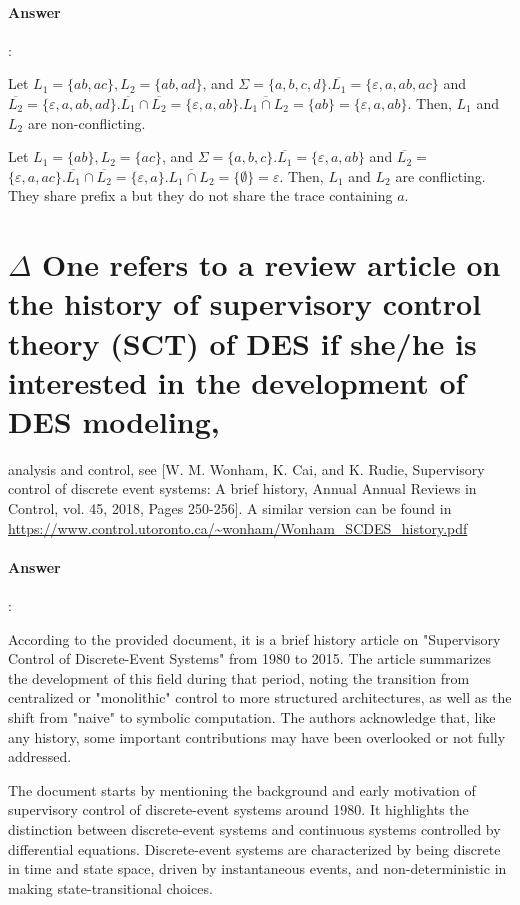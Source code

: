 \documentclass{article}
\begin{document}
\paragraph{Answer}:

Let $L_1=\{a b, a c\}, L_2=\{a b, a d\}$, and $\Sigma=\{a, b, c, d\} . \overline{L_1}=\{\varepsilon, a, a b, a c\}$ and $\overline{L_2}=\{\varepsilon, a, a b, a d\} . \overline{L_1} \cap \overline{L_2}=\{\varepsilon, a, a b\} . \overline{L_1 \cap L_2}=\{a b\}=\{\varepsilon, a, a b\}$. Then, $L_1$ and $L_2$ are non-conflicting.

Let $L_1=\{a b\}, L_2=\{a c\}$, and $\Sigma=\{a, b, c\} . \overline{L_1}=\{\varepsilon, a, a b\}$ and $\overline{L_2}=$ $\{\varepsilon, a, a c\} . \overline{L_1} \cap \overline{L_2}=\{\varepsilon, a\} . \overline{L_1 \cap L_2}=\{\emptyset\}=\varepsilon$. Then, $L_1$ and $L_2$ are conflicting. They share prefix a but they do not share the trace containing $a$.

\section{$\Delta $ One refers to a review article on the history of supervisory control theory (SCT) of DES if she/he is interested in the development of DES modeling, }

analysis and control, see [W. M. Wonham, K. Cai, and K. Rudie, Supervisory control of discrete event systems: A brief history, Annual Annual Reviews in Control, vol. 45, 2018, Pages 250-256]. A similar version can be found in \url{https://www.control.utoronto.ca/~wonham/Wonham_SCDES_history.pdf}

\paragraph{Answer}:


According to the provided document, it is a brief history article on "Supervisory Control of Discrete-Event Systems" from 1980 to 2015. The article summarizes the development of this field during that period, noting the transition from centralized or "monolithic" control to more structured architectures, as well as the shift from "naive" to symbolic computation. The authors acknowledge that, like any history, some important contributions may have been overlooked or not fully addressed.

The document starts by mentioning the background and early motivation of supervisory control of discrete-event systems around 1980. It highlights the distinction between discrete-event systems and continuous systems controlled by differential equations. Discrete-event systems are characterized by being discrete in time and state space, driven by instantaneous events, and non-deterministic in making state-transitional choices.
\end{document}
